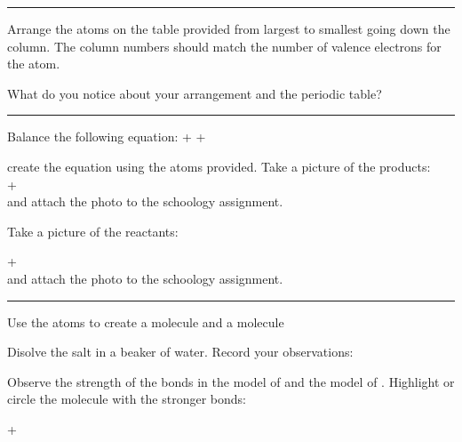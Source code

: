 \documentclass[12pt]{exam}
\begin{document}
\noindent\rule{\textwidth}{1pt}

Arrange the atoms on the table provided from largest to smallest going down the column. The column numbers should match the number of valence electrons for the atom.

\begin{questions}
  \question What do you notice about your arrangement and the periodic table?

  \vspace{4cm}

\end{questions}

\noindent\rule{\textwidth}{1pt}
\begin{questions}
 \question Balance the following equation: 
 \vspace{1cm}
  + \fillin[2][.5cm] \ce{->}   + \fillin[2][.5cm]

 \question create the equation using the atoms provided. Take a picture of the products:\\
  + \fillin[2][.5cm]\\ and attach the photo to the schoology assignment.

 \vspace{1cm}

 Take a picture of the reactants:

  + \fillin[2][.5cm] \\ and attach the photo to the schoology assignment.
\end{questions}

\noindent\rule{\textwidth}{1pt}

Use the atoms to create a  molecule and a  molecule

\begin{questions}
  \question Disolve the salt in a beaker of water. Record your observations:

  \vspace{2cm}

  \question Observe the strength of the bonds in the model of  and the model of . Highlight or circle the molecule with the stronger bonds:

   + 
\end{questions}
\end{document}
